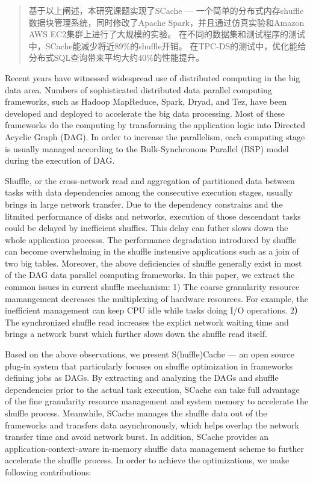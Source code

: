 \begin{abstract}
基于以上阐述，本研究课题实现了SCache --- 一个简单的分布式内存shuffle数据块管理系统，同时修改了Apache Spark，并且通过仿真实验和Amazon AWS EC2集群上进行了大规模的实验。
在不同的数据集和测试程序的测试中，SCache能减少将近89\%的shuffle开销。
在TPC-DS的测试中，优化能给分布式SQL查询带来平均大约40\%的性能提升。

\end{abstract}

\begin{englishabstract}

Recent years have witnessed widespread use of distributed computing in the big data area.
Numbers of sophisticated distributed data parallel computing frameworks, such as Hadoop MapReduce\cite{hadoop}, Spark\cite{spark}, Dryad\cite{dryad}, and Tez\cite{tez},
have been developed and deployed to accelerate the big data processing.
Most of these frameworks do the computing by transforming the application logic into Directed Acyclic Graph (DAG).
In order to increase the parallelism, each computing stage is usually managed according to the Bulk-Synchronous Parallel (BSP) model during the execution of DAG.

Shuffle, or the cross-network read and aggregation of partitioned data between tasks with data dependencies among the consecutive execution stages, 
usually brings in large network transfer. 
Due to the dependency constrains and the litmited performance of disks and networks, execution of those descendant tasks could be delayed by inefficient shuffles. 
This delay can futher slows down the whole application processs. 
The performance degradation introduced by shuffle can become overwhelming in the shuffle instensive applications such as a join of two big tables.
Moreover, the above deficiencies of shuffle generally exist in most of the DAG data parallel computing frameworks. 
In this paper, we extract the common issues in current shuffle mechanism: 
1) The coarse granularity resource mamangement decreases the multiplexing of hardware resources. For example, the inefficient management can keep CPU idle while tasks doing I/O operations.
2）The synchronized shuffle read increases the explict network waiting time and brings a network burst which further slows down the shuffle read itself.

Based on the above observations, we present S(huffle)Cache --- an open source plug-in system that particularly focuses on shuffle optimization in frameworks defining jobs as DAGs. 
By extracting and analyzing the DAGs and shuffle dependencies prior to the actual task execution, 
SCache can take full advantage of the fine granularity resource management and system memory to accelerate the shuffle process. 
Meanwhile, SCache manages the shuffle data out of the frameworks and transfers data asynchronously, which helps overlap the network transfer time and avoid network burst.
In addition, SCache provides an application-context-aware in-memory shuffle data management scheme to further accelerate the shuffle process.  
In order to achieve the optimizations, we make following contributions:


\end{englishabstract}
